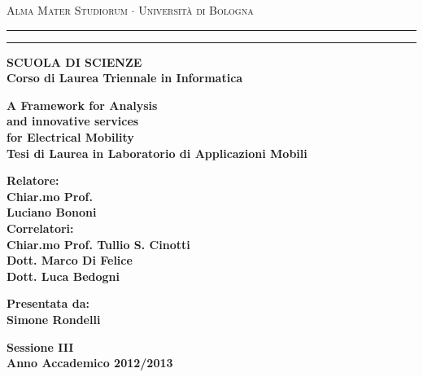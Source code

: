   \begin{titlepage}
    \begin{center}
      {{\Large{\textsc{Alma Mater Studiorum $\cdot$ Universit\`a di Bologna}}}} \rule[0.1cm]{15.8cm}{0.1mm}
      \rule[0.5cm]{15.8cm}{0.6mm}
      {\small{\bf SCUOLA DI SCIENZE\\
      Corso di Laurea Triennale in Informatica }}
    \end{center}
    
    \vspace{15mm}
    
    \begin{center}
      {\LARGE{\bf A Framework for Analysis}}\\
      \vspace{3mm}
      {\LARGE{\bf and innovative services}}\\
	  \vspace{3mm}
      {\LARGE{\bf for Electrical Mobility}}\\
      \vspace{15mm} 
      {\large{\bf Tesi di Laurea in Laboratorio di Applicazioni Mobili}}
    \end{center}
    
    \vspace{25mm}
    \par
    \noindent
    
    \begin{minipage}[t]{0.60\textwidth}
      {\large{\bf Relatore:\\
      Chiar.mo Prof.\\
      Luciano Bononi\newline}}\\
	{\large{\bf Correlatori:\\
	Chiar.mo Prof. Tullio S. Cinotti\\
	Dott. Marco Di Felice\\
	Dott. Luca Bedogni}}
    \end{minipage}
      \hfill
    \begin{minipage}[t]{0.34\textwidth}\raggedleft
    {\large{\bf Presentata da:\\
    Simone Rondelli}}  
    \end{minipage}
   \vspace{13mm}
    \begin{center}
	{\large{\bf Sessione III\\
	Anno Accademico 2012/2013}}
	\end{center}
	\clearpage{\pagestyle{empty}\cleardoublepage}%
  \end{titlepage}
  
